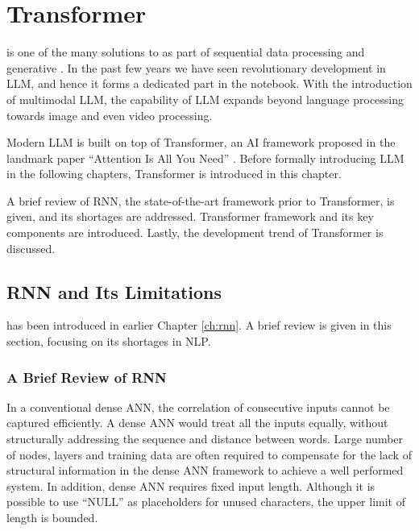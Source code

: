 \chapter{Transformer} \label{ch:transformer}

 is one of the many solutions to  as part of sequential data processing and generative . In the past few years we have seen revolutionary development in LLM, and hence it forms a dedicated part in the notebook. With the introduction of multimodal LLM, the capability of LLM expands beyond language processing towards image and even video processing. 

Modern LLM is built on top of Transformer, an AI framework proposed in the landmark paper ``Attention Is All You Need'' \cite{vaswani2017attention}. Before formally introducing LLM in the following chapters, Transformer is introduced in this chapter.

A brief review of RNN, the state-of-the-art framework prior to Transformer, is given, and its shortages are addressed. Transformer framework and its key components are introduced. Lastly, the development trend of Transformer is discussed.

\section{RNN and Its Limitations}

 has been introduced in earlier Chapter \ref{ch:rnn}. A brief review is given in this section, focusing on its shortages in NLP.

\subsection{A Brief Review of RNN}

In a conventional dense ANN, the correlation of consecutive inputs cannot be captured efficiently. A dense ANN would treat all the inputs equally, without structurally addressing the sequence and distance between words. Large number of nodes, layers and training data are often required to compensate for the lack of structural information in the dense ANN framework to achieve a well performed system. In addition, dense ANN requires fixed input length. Although it is possible to use ``NULL'' as placeholders for unused characters, the upper limit of length is bounded.

